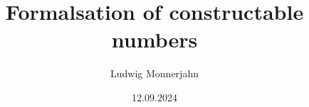 \documentclass[11pt, a4paper]{report}
\author{Ludwig Monnerjahn}
\date{12.09.2024}
\title{Formalsation of constructable numbers}
\begin{document}
\maketitle


\clearpage
\tableofcontents

\clearpage

\clearpage






\nocite{*}
\end{document}
